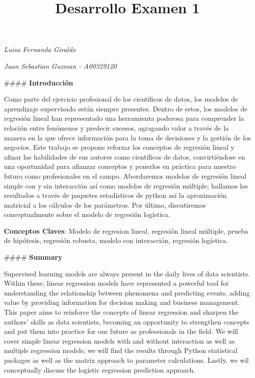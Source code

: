\documentclass[11pt]{article}
\title{Desarrollo Examen 1}
\begin{document}
    
    \maketitle
    
    

    
    \emph{Luisa Fernanda Giraldo}

\emph{Juan Sebastian Guzman - A00329120}

    \#\#\#\# \textbf{Introducción}

Como parte del ejercicio profesional de los científicos de datos, los
modelos de aprendizaje supervisado están siempre presentes. Dentro de
estos, los modelos de regresión lineal han representado una herramienta
poderosa para comprender la relación entre fenómenos y predecir sucesos,
agragando valor a través de la manera en la que ofrece información para
la toma de decisiones y la gestión de los negocios. Este trabajo se
propone reforzar los conceptos de regresión lineal y afinar las
habilidades de sus autores como científicos de datos, convirtiéndose en
una oportunidad para afianzar conceptos y ponerlos en práctica para
nuestro futuro como profesionales en el campo. Abordaremos modelos de
regresión lineal simple con y sin interacción así como modelos de
regresión múltiple; hallamos los resultados a través de paquetes
estadísticos de python así la aproximación matricial a los cálculos de
los parámetros. Por último, discutiremos conceptualmente sobre el modelo
de regresión logística.

\textbf{Conceptos Claves}: Modelo de regresion lineal, regresión lineal
múltiple, prueba de hipótesis, regresión robusta, modelo con
interacción, regresión logística.

\#\#\#\# \textbf{Summary}

Supervised learning models are always present in the daily lives of data
scientists. Within these, linear regression models have represented a
powerful tool for understanding the relationship between phenomena and
predicting events, adding value by providing information for decision
making and business management. This paper aims to reinforce the
concepts of linear regression and sharpen the authors' skills as data
scientists, becoming an opportunity to strengthen concepts and put them
into practice for our future as professionals in the field. We will
cover simple linear regression models with and without interaction as
well as multiple regression models; we will find the results through
Python statistical packages as well as the matrix approach to parameter
calculations. Lastly, we wil conceptually discuss the logistic
regression prediction approach.
\end{document}
